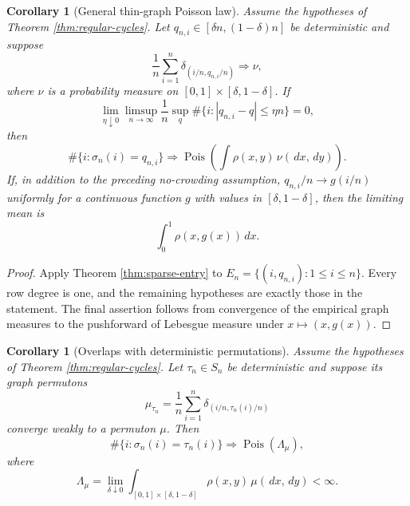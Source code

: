\documentclass[11pt]{article}
\newtheorem{corollary}[theorem]{Corollary}
\theoremstyle{remark}
\newcommand{\Pois}{\operatorname{Pois}}
\newcommand{\dd}{\,d}
\begin{document}
\begin{corollary}[General thin-graph Poisson law]\label{cor:thin-graph-general}
Assume the hypotheses of Theorem \ref{thm:regular-cycles}.  Let
$q_{n,i}\in[\delta n,(1-\delta)n]$ be deterministic and suppose
\[
        \frac1n\sum_{i=1}^n
        \delta_{(i/n,q_{n,i}/n)}\Rightarrow\nu,
\]
where $\nu$ is a probability measure on $[0,1]\times[\delta,1-\delta]$.
If
\[
        \lim_{\eta\downarrow0}\limsup_{n\to\infty}
        \frac1n\sup_q
        \#\{i:|q_{n,i}-q|\le\eta n\}=0,
\]
then
\[
        \#\{i:\sigma_n(i)=q_{n,i}\}
        \Rightarrow
        \Pois\!\left(\int\rho(x,y)\,\nu(\dd x,\dd y)\right).
\]
If, in addition to the preceding no-crowding assumption,
$q_{n,i}/n\to g(i/n)$ uniformly for a continuous function $g$ with values in
$[\delta,1-\delta]$, then the limiting mean is
\[
        \int_0^1\rho(x,g(x))\dd x.
\]
\end{corollary}

\begin{proof}
Apply Theorem \ref{thm:sparse-entry} to
$E_n=\{(i,q_{n,i}):1\le i\le n\}$.  Every row degree is one, and the remaining
hypotheses are exactly those in the statement.  The final assertion follows
from convergence of the empirical graph measures to the pushforward of
Lebesgue measure under $x\mapsto(x,g(x))$.
\end{proof}

\begin{corollary}[Overlaps with deterministic permutations]\label{cor:overlap-permutation}
Assume the hypotheses of Theorem \ref{thm:regular-cycles}.  Let
$\tau_n\in S_n$ be deterministic and suppose its graph permutons
\[
        \mu_{\tau_n}=\frac1n\sum_{i=1}^n
        \delta_{(i/n,\tau_n(i)/n)}
\]
converge weakly to a permuton $\mu$.  Then
\[
        \#\{i:\sigma_n(i)=\tau_n(i)\}
        \Rightarrow\Pois(\Lambda_\mu),
\]
where
\[
        \Lambda_\mu=
        \lim_{\delta\downarrow0}
        \int_{[0,1]\times[\delta,1-\delta]}
        \rho(x,y)\,\mu(\dd x,\dd y)<\infty.
\]
\end{corollary}
\end{document}
